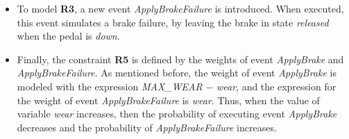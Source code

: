 \begin{example}
\begin{itemize}
    \item To model \textbf{R3}, a new event \textit{ApplyBrakeFailure} is introduced. When executed, this event simulates a brake failure, by leaving the brake in state \textit{released} when the pedal is \textit{down}.
    \item Finally, the constraint \textbf{R5} is defined by the weights of event \textit{ApplyBrake} and \textit{ApplyBrakeFailure}. As mentioned before, the weight of event \textit{ApplyBrake} is modeled with the expression \textit{MAX\_WEAR} $-$ \textit{wear}, and the expression for the weight of event \textit{ApplyBrakeFailure} is \textit{wear}. Thus, when the value of variable \textit{wear} increases, then the probability of executing event \textit{ApplyBrake} decreases and the probability of \textit{ApplyBrakeFailure} increases. 
    

\end{itemize}
\end{example}
